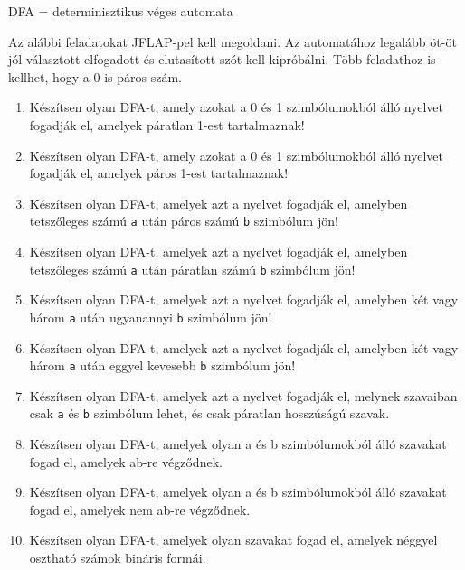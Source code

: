 \documentclass[a4paper]{article}
\begin{document}
DFA = determinisztikus véges automata

Az alábbi feladatokat JFLAP-pel kell megoldani. Az automatához legalább
öt-öt jól választott elfogadott és elutasított szót kell kipróbálni.
Több feladathoz is kellhet, hogy a 0 is páros szám.

\begin{enumerate}
\item Készítsen olyan DFA-t, amely azokat a 0 és 1 szimbólumokból
álló nyelvet fogadják el, amelyek páratlan 1-est tartalmaznak!

\item Készítsen olyan DFA-t, amely azokat a 0 és 1 szimbólumokból
álló nyelvet fogadják el, amelyek páros 1-est tartalmaznak!

\item Készítsen olyan DFA-t, amelyek azt a nyelvet fogadják el, amelyben
tetszőleges számú \verb|a| után páros számú \verb|b| szimbólum jön!

\item Készítsen olyan DFA-t, amelyek azt a nyelvet fogadják el, amelyben
tetszőleges számú \verb|a| után páratlan számú \verb|b| szimbólum jön!

\item Készítsen olyan DFA-t, amelyek azt a nyelvet fogadják el, amelyben
két vagy három \verb|a| után ugyanannyi \verb|b| szimbólum jön!

\item Készítsen olyan DFA-t, amelyek azt a nyelvet fogadják el, amelyben
két vagy három \verb|a| után eggyel kevesebb \verb|b| szimbólum jön!

\item Készítsen olyan DFA-t, amelyek azt a nyelvet fogadják el, melynek
szavaiban csak \verb|a| és \verb|b| szimbólum lehet, és csak páratlan
hosszúságú szavak.

\item Készítsen olyan DFA-t, amelyek olyan a és b szimbólumokból álló szavakat
fogad el, amelyek ab-re végződnek.

\item Készítsen olyan DFA-t, amelyek olyan a és b szimbólumokból álló szavakat
fogad el, amelyek nem ab-re végződnek.

\item Készítsen olyan DFA-t, amelyek olyan szavakat fogad el, amelyek néggyel
osztható számok bináris formái.


\end{enumerate}
\end{document}
